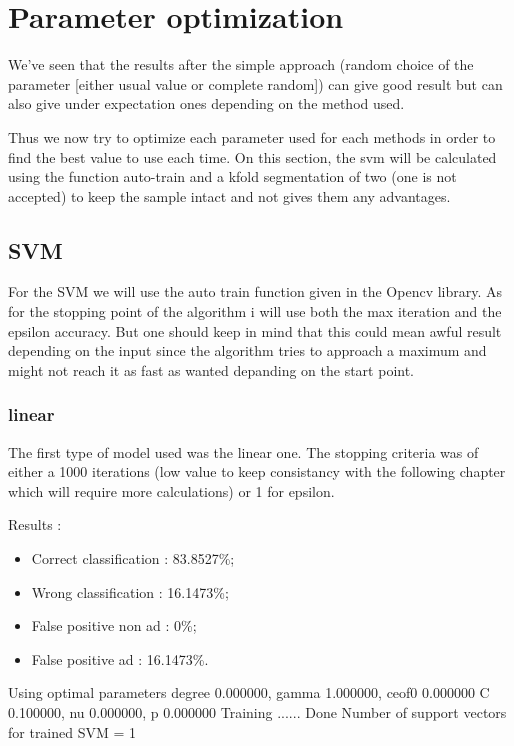 \chapter{Parameter optimization}

We've seen that the results after the simple approach (random choice of the parameter [either usual value or complete random]) can give good result but can also give under expectation ones depending on the method used.

Thus we now try to optimize each parameter used for each methods in order to find the best value to use each time. On this section, the svm will be calculated using the function auto-train and a kfold segmentation of two (one is not accepted) to keep the sample intact and not gives them any advantages.

\section{SVM}

For the SVM we will use the auto train function given in the Opencv library. As for the stopping point of the algorithm i will use both the max iteration and the epsilon accuracy. But one should keep in mind that this could mean awful result depending on the input since the algorithm tries to approach a maximum and might not reach it as fast as wanted depanding on the start point.

\subsection{linear}

The first type of model used was the linear one. The stopping criteria was of either a 1000 iterations (low value to keep consistancy with the following chapter which will require more calculations) or 1 for epsilon.

Results :
\begin{itemize}
  \item Correct classification : 83.8527\%;
  \item Wrong classification : 16.1473\%;
  \item False positive non ad : 0\%;
  \item False positive ad : 16.1473\%.
\end{itemize}
Using optimal parameters degree 0.000000, gamma 1.000000, ceof0 0.000000
	 C 0.100000, nu 0.000000, p 0.000000
 Training ...... Done
Number of support vectors for trained SVM = 1



